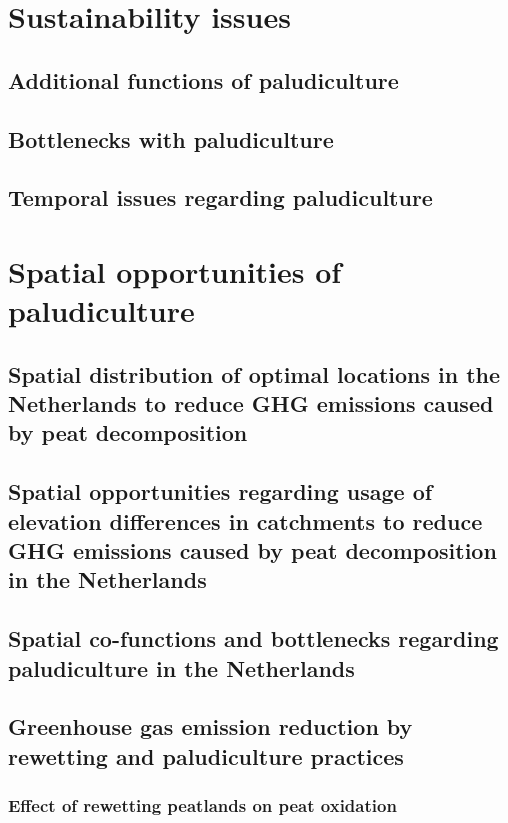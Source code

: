 {\chapter{Sustainability issues}

\section{Additional functions of paludiculture}

\section{Bottlenecks with paludiculture}

\section{Temporal issues regarding paludiculture}


\chapter{Spatial opportunities of paludiculture}

\section{Spatial distribution of optimal locations in the Netherlands to reduce GHG emissions caused by peat decomposition}

\section{Spatial opportunities regarding usage of elevation differences in catchments to reduce GHG emissions caused by peat decomposition in the Netherlands}

\section{Spatial co-functions and bottlenecks regarding paludiculture in the Netherlands}





\section{Greenhouse gas emission reduction by rewetting and paludiculture practices}

\subsection{Effect of rewetting peatlands on peat oxidation}

}
